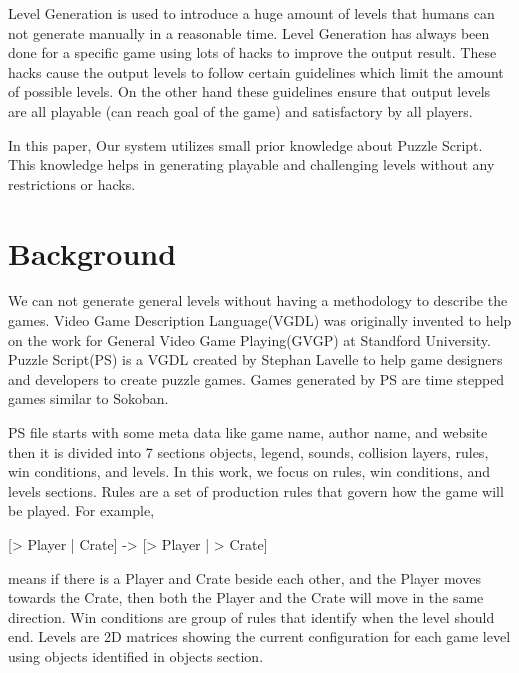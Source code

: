 \documentclass[letterpaper]{article}
\begin{document}
Level Generation is used to introduce a huge amount of levels that humans can not generate manually in a reasonable time. Level Generation has always been done for a specific game using lots of hacks to improve the output result. These hacks cause the output levels to follow certain guidelines which limit the amount of possible levels. On the other hand these guidelines ensure that output levels are all playable (can reach goal of the game) and satisfactory by all players\cite{mcGenerateEverything}.\\\par

In this paper, Our system utilizes small prior knowledge about Puzzle Script. This knowledge helps in generating playable and challenging levels without any restrictions or hacks.

\section{Background}
We can not generate general levels without having a methodology to describe the games. Video Game Description Language(VGDL) was originally invented to help on the work for General Video Game Playing(GVGP)\cite{gvgp} at Standford University. Puzzle Script(PS) is a VGDL created by Stephan Lavelle to help game designers and developers to create puzzle games\cite{puzzleScript}. Games generated by PS are time stepped games similar to Sokoban\cite{sokoban}.\\\par

PS file starts with some meta data like game name, author name, and website then it is divided into 7 sections objects, legend, sounds, collision layers, rules, win conditions, and levels. In this work, we focus on rules, win conditions, and levels sections. Rules are a set of production rules that govern how the game will be played. For example, \begin{center}[> Player | Crate] -> [> Player | > Crate]\end{center} means if there is a Player and Crate beside each other, and the Player moves towards the Crate, then both the Player and the Crate will move in the same direction. Win conditions are group of rules that identify when the level should end. Levels are 2D matrices showing the current configuration for each game level using objects identified in objects section.
\end{document}
